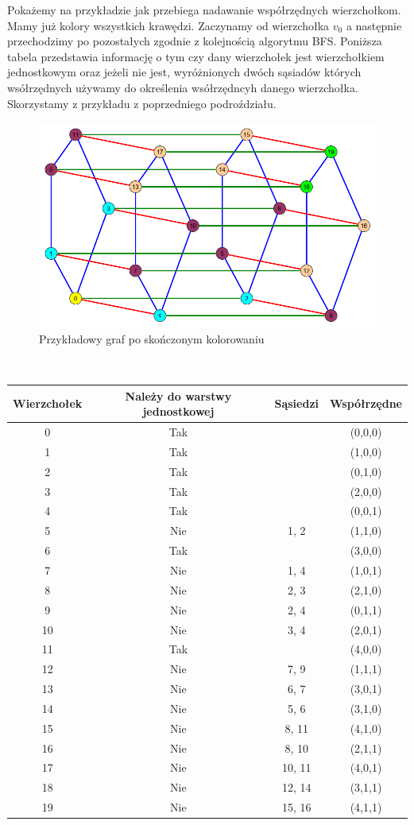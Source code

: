 \documentclass[12pt,a4paper,titlepage]{article}
\begin{document}
Pokażemy na przykładzie jak przebiega nadawanie współrzędnych wierzchołkom. Mamy już kolory wszystkich krawędzi. Zaczynamy od wierzchołka $v_0$ a następnie przechodzimy po pozostałych zgodnie z kolejnością algorytmu BFS. Poniższa tabela przedstawia informację o tym czy dany wierzchołek jest wierzchołkiem jednostkowym oraz jeżeli nie jest, wyróżnionych dwóch sąsiadów których wsółrzędnych używamy do określenia wsółrzędncyh danego wierzchołka. Skorzystamy z przykładu z poprzedniego podroździału.\\
\begin{figure}[h]
\centering
\includegraphics[width = 11.5cm]{kol5.png}
\caption{Przykładowy graf po skończonym kolorowaniu}
\end{figure}
\\
\begin{tabular}{|c|c|c|c|}\hline
\textbf{Wierzchołek} & \textbf{Należy do warstwy jednostkowej} & \textbf{Sąsiedzi} & \textbf{Współrzędne} \\ \hline
0 & Tak &  & (0,0,0)\\ \hline
1 & Tak &  & (1,0,0)\\ \hline
2 & Tak &  & (0,1,0)\\ \hline
3 & Tak &  & (2,0,0)\\ \hline
4 & Tak &  & (0,0,1)\\ \hline
5 & Nie & 1, 2 & (1,1,0)\\ \hline
6 & Tak &  & (3,0,0)\\ \hline
7 & Nie & 1, 4 & (1,0,1)\\ \hline
8 & Nie & 2, 3 & (2,1,0)\\ \hline
9 & Nie & 2, 4 & (0,1,1)\\ \hline
10 & Nie & 3, 4 & (2,0,1)\\ \hline
11& Tak &  & (4,0,0)\\ \hline
12& Nie & 7, 9 & (1,1,1)\\ \hline
13& Nie & 6, 7 & (3,0,1)\\ \hline
14& Nie & 5, 6 & (3,1,0)\\ \hline
15& Nie & 8, 11 & (4,1,0)\\ \hline
16& Nie &  8, 10& (2,1,1)\\ \hline
17& Nie & 10, 11 & (4,0,1)\\ \hline
18& Nie & 12, 14 & (3,1,1)\\ \hline
19& Nie & 15, 16 & (4,1,1)\\ \hline
\end{tabular}
\newpage
\end{document}
